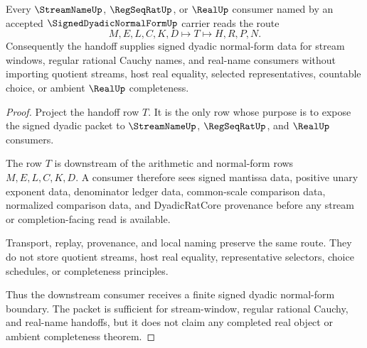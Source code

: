 \begin{theorem}
\label{thm:signed-dyadic-normal-form-real-handoff}
Every $\StreamNameUp$, $\RegSeqRatUp$, or $\RealUp$ consumer named by an accepted $\SignedDyadicNormalFormUp$ carrier reads the route
$$
M,E,L,C,K,D \longmapsto T \longmapsto H,R,P,N .
$$
Consequently the handoff supplies signed dyadic normal-form data for stream windows, regular rational Cauchy names, and real-name consumers without importing quotient streams, host real equality, selected representatives, countable choice, or ambient $\RealUp$ completeness.
\end{theorem}
\begin{proof}
Project the handoff row $T$. It is the only row whose purpose is to expose the signed dyadic packet to $\StreamNameUp$, $\RegSeqRatUp$, and $\RealUp$ consumers.

The row $T$ is downstream of the arithmetic and normal-form rows $M,E,L,C,K,D$. A consumer therefore sees signed mantissa data, positive unary exponent data, denominator ledger data, common-scale comparison data, normalized comparison data, and DyadicRatCore provenance before any stream or completion-facing read is available.

Transport, replay, provenance, and local naming preserve the same route. They do not store quotient streams, host real equality, representative selectors, choice schedules, or completeness principles.

Thus the downstream consumer receives a finite signed dyadic normal-form boundary. The packet is sufficient for stream-window, regular rational Cauchy, and real-name handoffs, but it does not claim any completed real object or ambient completeness theorem.
\end{proof}


